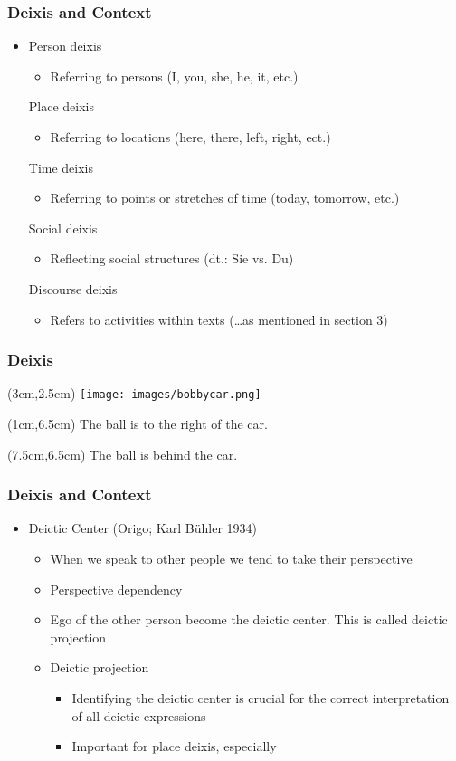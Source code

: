 \documentclass[12pt, table]{beamer}
\begin{document}
\begin{frame}
\frametitle{Deixis and Context}
\begin{itemize}
\item Person deixis
\begin{itemize}
\item Referring to persons (I, you, she, he, it, etc.)
\end{itemize}
Place deixis
\begin{itemize}
\item Referring to locations (here, there, left, right, ect.)
\end{itemize}
Time deixis
\begin{itemize}
\item Referring to points or stretches of time (today, tomorrow, etc.)
\end{itemize}
Social deixis
\begin{itemize}
\item Reflecting social structures (dt.: Sie vs. Du)
\end{itemize}
Discourse deixis
\begin{itemize}
\item Refers to activities within texts (\dots as mentioned in section 3)
\end{itemize}
\end{itemize}
\end{frame}

\begin{frame}
\frametitle{Deixis}
\begin{textblock*}{1cm}(3cm,2.5cm)
\texttt{[image: images/bobbycar.png]}
\end{textblock*}
\begin{textblock*}{6.5cm}(1cm,6.5cm)
The ball is to the right of the car.
\end{textblock*}
\begin{textblock*}{5cm}(7.5cm,6.5cm)
The ball is behind the car.
\end{textblock*}
\end{frame}

\begin{frame}
\frametitle{Deixis and Context}
\begin{itemize}
\item Deictic Center (Origo; Karl B{\"u}hler 1934)
\begin{itemize}
\item When we speak to other people we tend to take their perspective 
\item Perspective dependency
\item Ego of the other person become the deictic center. This is called deictic projection
\item Deictic projection
\begin{itemize}
\item Identifying the deictic center is crucial for the correct interpretation of all deictic expressions
\item Important for place deixis, especially
\end{itemize}
\end{itemize}
\end{itemize}
\end{frame}
\end{document}
